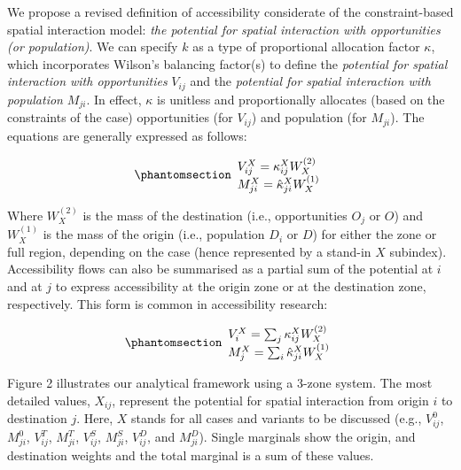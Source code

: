 \documentclass[
  10pt,
  letterpaper,
]{article}
\begin{document}
We propose a revised definition of accessibility considerate of the
constraint-based spatial interaction model: \emph{the potential for
spatial interaction with opportunities (or population)}. We can specify
\(k\) as a type of proportional allocation factor \(\kappa\), which
incorporates Wilson's balancing factor(s) to define the \emph{potential
for spatial interaction with opportunities} \(V_{ij}\) and the
\emph{potential for spatial interaction with population} \(M_{ji}\). In
effect, \(\kappa\) is unitless and proportionally allocates (based on
the constraints of the case) opportunities (for \(V_{ij}\)) and
population (for \(M_{ji}\)). The equations are generally expressed as
follows:

\begin{equation}\phantomsection\label{eq-access-01}{
\begin{array}{l}
V_{ij}^X = \kappa_{ij}^X W_X^{(2)}\\ 
M_{ji}^X = \hat \kappa_{ji}^X W_X^{(1)}
\end{array}
}\end{equation}

\noindent Where \(W_X^{(2)}\) is the mass of the destination (i.e.,
opportunities \(O_j\) or \(O\)) and \(W_X^{(1)}\) is the mass of the
origin (i.e., population \(D_i\) or \(D\)) for either the zone or full
region, depending on the case (hence represented by a stand-in \(X\)
subindex). Accessibility flows can also be summarised as a partial sum
of the potential at \(i\) and at \(j\) to express accessibility at the
origin zone or at the destination zone, respectively. This form is
common in accessibility research:

\begin{equation}\phantomsection\label{eq-accesssibility-01}{
\begin{array}{l}
V_{i}^X = \sum_j \kappa_{ij}^X W_X^{(2)}\\
M_{j}^X = \sum_i \hat \kappa_{ji}^X W_X^{(1)}
\end{array}
}\end{equation}

Figure 2 illustrates our analytical framework using a 3-zone system. The
most detailed values, \(X_{ij}\), represent the potential for spatial
interaction from origin \(i\) to destination \(j\). Here, \(X\) stands
for all cases and variants to be discussed (e.g., \(V_{ij}^0\),
\(M_{ji}^0\), \(V_{ij}^T\), \(M_{ji}^T\), \(V_{ij}^S\), \(M_{ji}^S\),
\(V_{ij}^D\), and \(M_{ji}^D\)). Single marginals show the origin, and
destination weights and the total marginal is a sum of these values.
\end{document}
